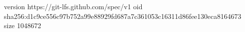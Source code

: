 version https://git-lfs.github.com/spec/v1
oid sha256:d1c9ce556c97b752a99e88929fd687a7c361053c16311d86fee130eca8164673
size 1048672
